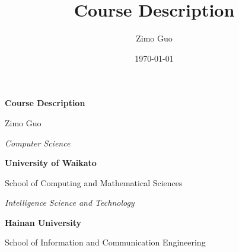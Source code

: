 \documentclass{article}
\title{Course Description}
\author{Zimo Guo}
\date{\today}
\newcommand{\studentname}{Zimo Guo}
\newcommand{\majornameA}{Computer Science}
\newcommand{\majornameB}{Intelligence Science and Technology}
\newcommand{\univA}{University of Waikato}
\newcommand{\collegeA}{School of Computing and Mathematical Sciences}
\newcommand{\univB}{Hainan University}
\newcommand{\collegeB}{School of Information and Communication Engineering}
\begin{document}
\begin{titlepage}
    \centering
    \vspace*{2.5cm}
    {\Huge \textbf{Course Description}\par}
    \vspace{1.5cm}
    {\LARGE\studentname\par}
    \vfill
    {\LARGE\emph{\majornameA}\par}
    \vspace{0.5cm}
    {\Large\bfseries\univA\par}
    {\large\collegeA\par}
    \vspace{1.2cm}
    {\LARGE\emph{\majornameB}\par}
    \vspace{0.5cm}
    {\Large\bfseries\univB\par}
    {\large\collegeB\par}
    \vfill
\end{titlepage}

\clearpage

\thispagestyle{empty}
\end{document}

